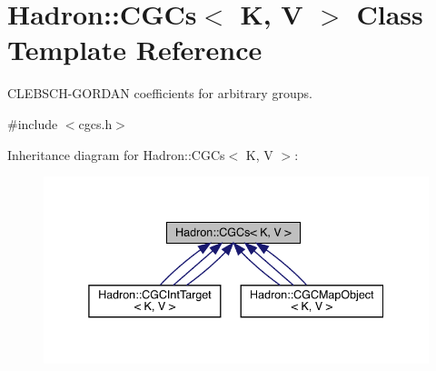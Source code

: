 \hypertarget{classHadron_1_1CGCs}{}\section{Hadron\+:\+:C\+G\+Cs$<$ K, V $>$ Class Template Reference}
\label{classHadron_1_1CGCs}


C\+L\+E\+B\+S\+C\+H-\/\+G\+O\+R\+D\+AN coefficients for arbitrary groups.  




{\ttfamily \#include $<$cgcs.\+h$>$}



Inheritance diagram for Hadron\+:\+:C\+G\+Cs$<$ K, V $>$\+:
\nopagebreak
\begin{figure}[H]
\begin{center}
\leavevmode
\includegraphics[width=338pt]{dc/d82/classHadron_1_1CGCs__inherit__graph}
\end{center}
\end{figure}
